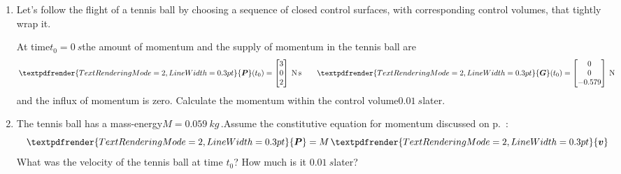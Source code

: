 \documentclass[a4paper,12pt,%
onecolumn,oneside,titlepage,%
british%
]{memoir}
\renewcommand*{\bm}[1]{\textpdfrender{TextRenderingMode=2,LineWidth=0.3pt}{\boldsymbol{#1}}}
\renewcommand*{\|}[1][]{\nonscript\:#1\vert\nonscript\:\mathopen{}}
\newcommand*{\yv}{\bm{v}}
\newcommand*{\yM}{M}%
\newcommand*{\yP}{\bm{P}}
\newcommand*{\yG}{\bm{G}}
\newcommand*{\masse}{mass-energy}
\begin{document}
%
\begin{exercise}[label={ex:tennisball}]
  \begin{enumerate}[shift,label=\bfseries\arabic*.]
  \item Let's follow the flight of a tennis ball by choosing a sequence of closed control surfaces, with corresponding control volumes, that tightly wrap it.

    At time\enspace$t_{0}=\qty{0}{s}$\enspace the amount of momentum and the supply of momentum in the tennis ball are
    \begin{equation*}
      \yP(t_{0}) =
      \begin{bmatrix}
        3\\0\\2
      \end{bmatrix}\:\unit{N\,s}
      \qquad
      \yG(t_{0}) =
      \begin{bmatrix}
        0\\0\\-0.579
      \end{bmatrix}\:\unit{N}
    \end{equation*}
    and the influx of momentum is zero. Calculate the momentum within the control volume\enspace$\qty{0.01}{s}$\enspace later.

  \item The tennis ball has a \masse\enspace$\yM = \qty{0.059}{kg}$\,.\enspace Assume the constitutive equation for momentum discussed on p.~\pageref{item:momentum_mass_velocity}:
    \begin{equation*}
      \yP = \yM\,\yv
    \end{equation*}
    What was the velocity of the tennis ball at time $t_{0}$? How much is it \enspace$\qty{0.01}{s}$\enspace later?
  \end{enumerate}
\end{exercise}
\end{document}
